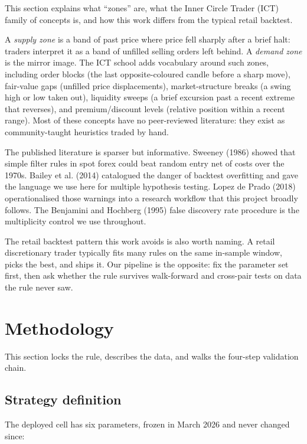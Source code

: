 \documentclass[11pt,a4paper]{article}
\begin{document}
This section explains what \enquote{zones} are, what the Inner Circle
Trader (ICT) family of concepts is, and how this work differs from the
typical retail backtest.

A \emph{supply zone} is a band of past price where price fell sharply
after a brief halt: traders interpret it as a band of unfilled selling
orders left behind. A \emph{demand zone} is the mirror image. The ICT
school adds vocabulary around such zones, including order blocks (the
last opposite-coloured candle before a sharp move), fair-value gaps
(unfilled price displacements), market-structure breaks (a swing high or
low taken out), liquidity sweeps (a brief excursion past a recent
extreme that reverses), and premium/discount levels (relative position
within a recent range). Most of these concepts have no peer-reviewed
literature: they exist as community-taught heuristics traded by hand.

The published literature is sparser but informative. Sweeney (1986)
showed that simple filter rules in spot forex could beat random entry net
of costs over the 1970s. Bailey et al. (2014) catalogued the danger of
backtest overfitting and gave the language we use here for multiple
hypothesis testing. Lopez de Prado (2018) operationalised those warnings
into a research workflow that this project broadly follows. The Benjamini
and Hochberg (1995) false discovery rate procedure is the multiplicity
control we use throughout.

The retail backtest pattern this work avoids is also worth naming. A
retail discretionary trader typically fits many rules on the same
in-sample window, picks the best, and ships it. Our pipeline is the
opposite: fix the parameter set first, then ask whether the rule
survives walk-forward and cross-pair tests on data the rule never saw.

\section{Methodology}\label{sec:method}

This section locks the rule, describes the data, and walks the four-step
validation chain.

\subsection{Strategy definition}

The deployed cell has six parameters, frozen in March 2026 and never
changed since:
\end{document}

